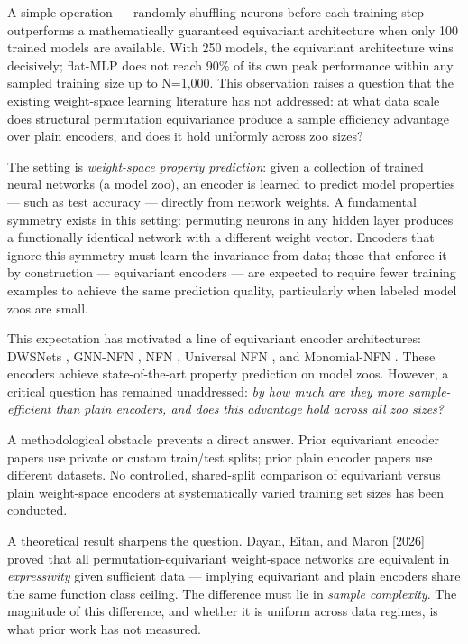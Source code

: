 
A simple operation --- randomly shuffling neurons before each training step --- outperforms a mathematically guaranteed equivariant architecture when only 100 trained models are available. With 250 models, the equivariant architecture wins decisively; flat-MLP does not reach 90\% of its own peak performance within any sampled training size up to N=1,000. This observation raises a question that the existing weight-space learning literature has not addressed: at what data scale does structural permutation equivariance produce a sample efficiency advantage over plain encoders, and does it hold uniformly across zoo sizes?

The setting is \textit{weight-space property prediction}: given a collection of trained neural networks (a model zoo), an encoder is learned to predict model properties --- such as test accuracy --- directly from network weights. A fundamental symmetry exists in this setting: permuting neurons in any hidden layer produces a functionally identical network with a different weight vector. Encoders that ignore this symmetry must learn the invariance from data; those that enforce it by construction --- equivariant encoders --- are expected to require fewer training examples to achieve the same prediction quality, particularly when labeled model zoos are small.

This expectation has motivated a line of equivariant encoder architectures: DWSNets \citep{Navon2023Equivariant}, GNN-NFN \citep{Kofinas2024Graph}, NFN \citep{Zhou2023Permutation}, Universal NFN \citep{Zhou2024Universal}, and Monomial-NFN \citep{Tran2024Monomial}. These encoders achieve state-of-the-art property prediction on model zoos. However, a critical question has remained unaddressed: \textit{by how much are they more sample-efficient than plain encoders, and does this advantage hold across all zoo sizes?}

A methodological obstacle prevents a direct answer. Prior equivariant encoder papers use private or custom train/test splits; prior plain encoder papers use different datasets. No controlled, shared-split comparison of equivariant versus plain weight-space encoders at systematically varied training set sizes has been conducted.

A theoretical result sharpens the question. Dayan, Eitan, and Maron [2026] proved that all permutation-equivariant weight-space networks are equivalent in \textit{expressivity} given sufficient data --- implying equivariant and plain encoders share the same function class ceiling. The difference must lie in \textit{sample complexity}. The magnitude of this difference, and whether it is uniform across data regimes, is what prior work has not measured.

